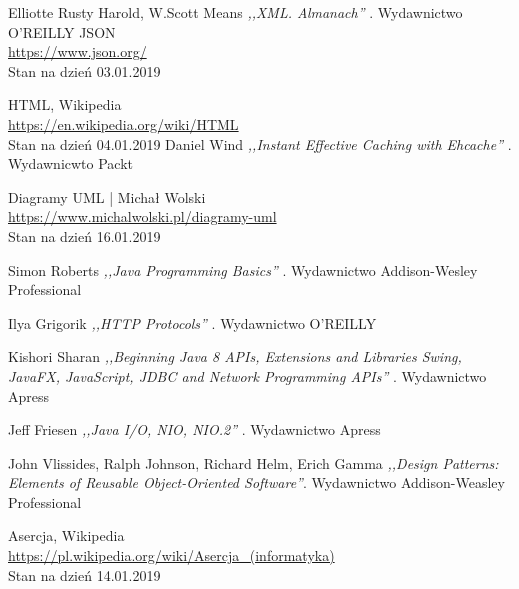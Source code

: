 \documentclass[12pt, twoside]{report}
\begin{document}
\begin{thebibliography}{9}
Elliotte Rusty Harold, W.Scott Means \emph{ ,,XML. Almanach'' }. Wydawnictwo O'REILLY
  JSON \\
  \url{https://www.json.org/} \\
  Stan na dzień 03.01.2019

    HTML, Wikipedia \\
	\url{https://en.wikipedia.org/wiki/HTML} \\
	Stan na dzień 04.01.2019
Daniel Wind \emph{ ,,Instant Effective Caching with Ehcache'' }. Wydawnicwto Packt


	Diagramy UML | Michał Wolski\\ \url{https://www.michalwolski.pl/diagramy-uml} \\
	Stan na dzień 16.01.2019
		

Simon Roberts \emph{ ,,Java Programming Basics'' }. Wydawnictwo Addison-Wesley Professional

Ilya Grigorik \emph{ ,,HTTP Protocols'' }. Wydawnictwo O'REILLY

Kishori Sharan \emph{ ,,Beginning Java 8 APIs, Extensions and Libraries Swing, JavaFX, JavaScript, JDBC and Network Programming APIs'' }. Wydawnictwo Apress
 
Jeff Friesen \emph{ ,,Java I/O, NIO, NIO.2'' }. Wydawnictwo Apress

John Vlissides, Ralph Johnson, Richard Helm, Erich Gamma \emph{ ,,Design Patterns: Elements of Reusable Object-Oriented Software''}. Wydawnictwo Addison-Weasley Professional


Asercja, Wikipedia \\
\url{https://pl.wikipedia.org/wiki/Asercja_(informatyka)} \\
Stan na dzień 14.01.2019

\end{thebibliography}
\end{document}
